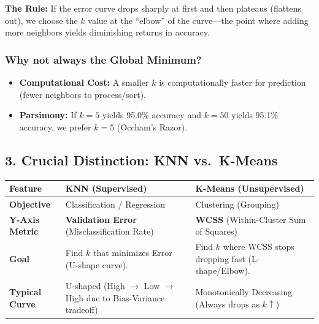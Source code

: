 \documentclass[
  italian,
  11pt,
]{article}
\newcounter{none} %
\begin{document}
\textbf{The Rule:} If the error curve drops sharply at first and then
plateaus (flattens out), we choose the \(k\) value at the ``elbow'' of
the curve---the point where adding more neighbors yields diminishing
returns in accuracy.

\subsubsection{Why not always the Global
Minimum?}\label{why-not-always-the-global-minimum}

\begin{itemize}
\item
  \textbf{Computational Cost:} A smaller \(k\) is computationally faster
  for prediction (fewer neighbors to process/sort).
\item
  \textbf{Parsimony:} If \(k=5\) yields 95.0\% accuracy and \(k=50\)
  yields 95.1\% accuracy, we prefer \(k=5\) (Occham's Razor).
\end{itemize}

\subsection{3. Crucial Distinction: KNN
vs.~K-Means}\label{crucial-distinction-knn-vs.-k-means}

{\def\LTcaptype{none} %
\begin{longtable}[]{@{}
  >{\raggedright\arraybackslash}p{}
  >{\raggedright\arraybackslash}p{}
  >{\raggedright\arraybackslash}p{}@{}}
\toprule\noalign{}
\begin{minipage}[b]{\linewidth}\raggedright
\textbf{Feature}
\end{minipage} & \begin{minipage}[b]{\linewidth}\raggedright
\textbf{KNN (Supervised)}
\end{minipage} & \begin{minipage}[b]{\linewidth}\raggedright
\textbf{K-Means (Unsupervised)}
\end{minipage} \\
\midrule\noalign{}
\endhead
\bottomrule\noalign{}
\endlastfoot
\textbf{Objective} & Classification / Regression & Clustering
(Grouping) \\
\textbf{Y-Axis Metric} & \textbf{Validation Error} (Misclassification
Rate) & \textbf{WCSS} (Within-Cluster Sum of Squares) \\
\textbf{Goal} & Find \(k\) that minimizes Error (U-shape curve). & Find
\(k\) where WCSS stops dropping fast (L-shape/Elbow). \\
\textbf{Typical Curve} & U-shaped (High \(\to\) Low \(\to\) High due to
Bias-Variance tradeoff) & Monotonically Decreasing (Always drops as
\(k \uparrow\)) \\
\end{longtable}
}
\end{document}
